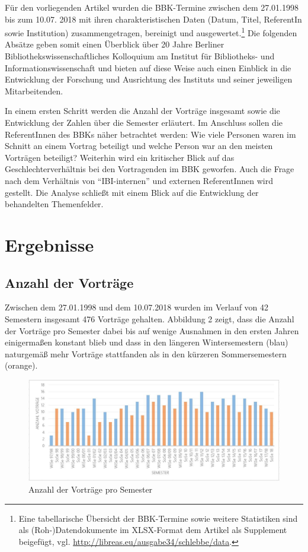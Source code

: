 \documentclass[a4paper,
fontsize=11pt,
oneside,
numbers=noperiodatend,
parskip=half-,
bibliography=totoc,
final
]{scrartcl}
\begin{document}
Für den vorliegenden Artikel wurden die BBK-Termine zwischen dem
27.01.1998 bis zum 10.07. 2018 mit ihren charakteristischen Daten (Datum,
Titel, ReferentIn sowie Institution) zusammengetragen, bereinigt und
ausgewertet.\footnote{Eine tabellarische Übersicht der BBK-Termine sowie
  weitere Statistiken sind als (Roh-)Datendokumente im XLSX-Format dem
  Artikel als Supplement beigefügt, vgl. \url{http://libreas.eu/ausgabe34/schlebbe/data}.} Die folgenden Absätze geben somit
einen Überblick über 20 Jahre Berliner Bibliothekswissenschaftliches
Kolloquium am Institut für Bibliotheks- und Informationswissenschaft und
bieten auf diese Weise auch einen Einblick in die Entwicklung der
Forschung und Ausrichtung des Instituts und seiner jeweiligen
Mitarbeitenden.

In einem ersten Schritt werden die Anzahl der Vorträge insgesamt sowie
die Entwicklung der Zahlen über die Semester erläutert. Im Anschluss
sollen die ReferentInnen des BBKs näher betrachtet werden: Wie viele
Personen waren im Schnitt an einem Vortrag beteiligt und welche Person
war an den meisten Vorträgen beteiligt? Weiterhin wird ein kritischer
Blick auf das Geschlechterverhältnis bei den Vortragenden im BBK
geworfen. Auch die Frage nach dem Verhältnis von \enquote{IBI-internen}
und externen ReferentInnen wird gestellt. Die Analyse schließt mit einem
Blick auf die Entwicklung der behandelten Themenfelder.

\hypertarget{ergebnisse}{%
\section{Ergebnisse}\label{ergebnisse}}

\hypertarget{anzahl-der-vortruxe4ge}{%
\subsection{Anzahl der Vorträge}\label{anzahl-der-vortruxe4ge}}

Zwischen dem 27.01.1998 und dem 10.07.2018 wurden im Verlauf von 42
Semestern insgesamt 476 Vorträge gehalten. Abbildung 2 zeigt, dass die
Anzahl der Vorträge pro Semester dabei bis auf wenige Ausnahmen in den
ersten Jahren einigermaßen konstant blieb und dass in den längeren
Wintersemestern (blau) naturgemäß mehr Vorträge stattfanden als in den
kürzeren Sommersemestern (orange).

\begin{figure}[h!]
\centering
\includegraphics[width=15cm]{img/Abbildung2.JPG}
\caption{Anzahl der Vorträge pro Semester}
\end{figure}
\end{document}
